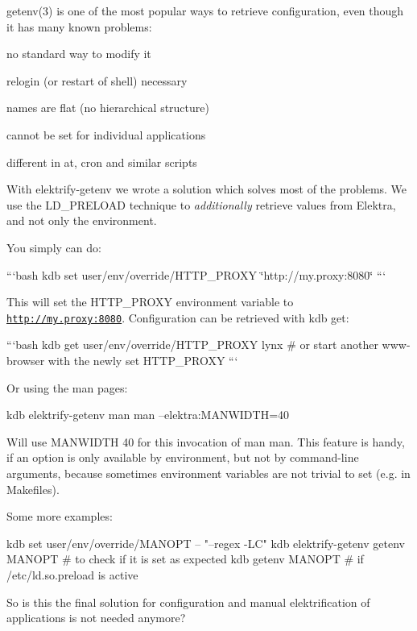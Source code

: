 getenv(3) is one of the most popular ways to retrieve configuration, even though it has many known problems\+:


\begin{DoxyItemize}
\item no standard way to modify it
\item relogin (or restart of shell) necessary
\item names are flat (no hierarchical structure)
\item cannot be set for individual applications
\item different in at, cron and similar scripts
\end{DoxyItemize}

With elektrify-\/getenv we wrote a solution which solves most of the problems. We use the L\+D\+\_\+\+P\+R\+E\+L\+O\+A\+D technique to {\itshape additionally} retrieve values from Elektra, and not only the environment.

You simply can do\+:

```bash kdb set user/env/override/\+H\+T\+T\+P\+\_\+\+P\+R\+O\+X\+Y \char`\"{}http\+://my.\+proxy\+:8080\char`\"{} ```

This will set the {\ttfamily H\+T\+T\+P\+\_\+\+P\+R\+O\+X\+Y} environment variable to {\ttfamily \href{http://my.proxy:8080}{\tt http\+://my.\+proxy\+:8080}}. Configuration can be retrieved with {\ttfamily kdb get}\+:

```bash kdb get user/env/override/\+H\+T\+T\+P\+\_\+\+P\+R\+O\+X\+Y lynx \# or start another www-\/browser with the newly set H\+T\+T\+P\+\_\+\+P\+R\+O\+X\+Y ```

Or using the man pages\+: \begin{DoxyVerb}kdb elektrify-getenv man man --elektra:MANWIDTH=40
\end{DoxyVerb}


Will use M\+A\+N\+W\+I\+D\+T\+H 40 for this invocation of man man. This feature is handy, if an option is only available by environment, but not by command-\/line arguments, because sometimes environment variables are not trivial to set (e.\+g. in Makefiles).

Some more examples\+: \begin{DoxyVerb}kdb set user/env/override/MANOPT -- "--regex -LC"
kdb elektrify-getenv getenv MANOPT   # to check if it is set as expected
kdb getenv MANOPT   # if /etc/ld.so.preload is active
\end{DoxyVerb}


So is this the final solution for configuration and manual elektrification of applications is not needed anymore?

